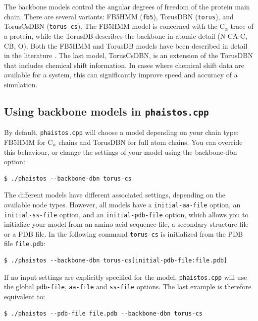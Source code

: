 \documentclass[11pt,a4paper,twoside]{book}
\begin{document}
The backbone models control the angular degrees of freedom of the
protein main chain. There are several variants: FB5HMM (\texttt{fb5}),
TorusDBN (\texttt{torus}), and TorusCsDBN (\texttt{torus-cs}). The
FB5HMM model is concerned with the $\mathrm{C}_\alpha$ trace of a
protein, while the TorusDB describes the backbone in atomic detail
(N-CA-C, CB, O). Both the FB5HMM and TorusDB models have been
described in detail in the literature \cite{hamelryck2006srp,
  boomsma2008gpm}. The last model, TorusCsDBN, is an extension of the
TorusDBN that includes chemical shift information. In cases where
chemical shift data are available for a system, this can significantly
improve speed and accuracy of a simulation.

\subsection{Using backbone models in \texttt{phaistos.cpp}}
By default, \texttt{phaistos.cpp} will choose a model depending on
your chain type: FB5HMM for $\mathrm{C}_\alpha$ chains and TorusDBN
for full atom chains. You can override this behaviour, or change the
settings of your model using the backbone-dbn option:

\begin{verbatim}
$ ./phaistos --backbone-dbn torus-cs
\end{verbatim}

\noindent
The different models have different associated settings, depending on
the available node types. However, all models have a
\texttt{initial-aa-file} option, an \texttt{initial-ss-file} option,
and an \texttt{initial-pdb-file} option, which allows you to
initialize your model from an amino acid sequence file, a secondary
structure file or a PDB file. In the following command
\texttt{torus-cs} is initialized from the PDB file \texttt{file.pdb}:

\begin{verbatim}
$ ./phaistos --backbone-dbn torus-cs[initial-pdb-file:file.pdb]
\end{verbatim}

\noindent
If no input settings are explicitly specified for the model,
\texttt{phaistos.cpp} will use the global \texttt{pdb-file},
\texttt{aa-file} and \texttt{ss-file} options. The last example
is therefore equivalent to:

\begin{verbatim}
$ ./phaistos --pdb-file file.pdb --backbone-dbn torus-cs
\end{verbatim}
\end{document}
